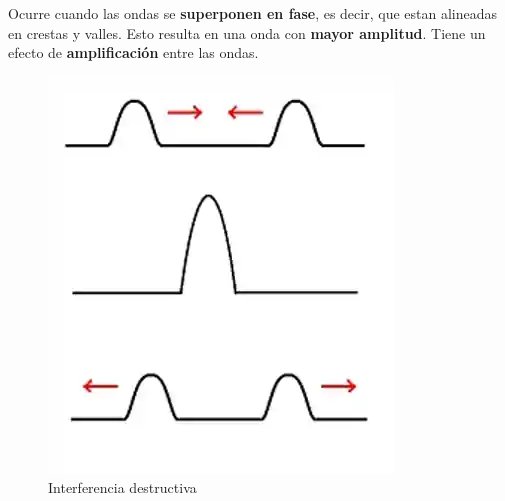 Ocurre cuando las ondas se \textbf{superponen en fase}, es decir, que estan alineadas en crestas y valles. Esto resulta en una onda con \textbf{mayor amplitud}. Tiene un efecto de \textbf{amplificación} entre las ondas.

\begin{figure}[H]
  \centering
  \includegraphics[scale=0.4]{imagenes/interferencia_constructiva.png}
  \caption{Interferencia destructiva\cite{respaionterf}}
\end{figure}
